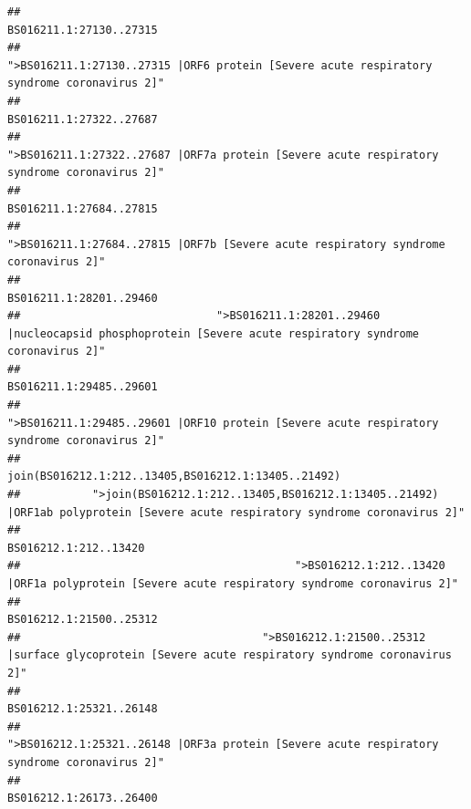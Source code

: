 \documentclass[
]{article}
\begin{document}
\begin{verbatim}
##                                                                                                                BS016211.1:27130..27315 
##                                             ">BS016211.1:27130..27315 |ORF6 protein [Severe acute respiratory syndrome coronavirus 2]" 
##                                                                                                                BS016211.1:27322..27687 
##                                            ">BS016211.1:27322..27687 |ORF7a protein [Severe acute respiratory syndrome coronavirus 2]" 
##                                                                                                                BS016211.1:27684..27815 
##                                                    ">BS016211.1:27684..27815 |ORF7b [Severe acute respiratory syndrome coronavirus 2]" 
##                                                                                                                BS016211.1:28201..29460 
##                              ">BS016211.1:28201..29460 |nucleocapsid phosphoprotein [Severe acute respiratory syndrome coronavirus 2]" 
##                                                                                                                BS016211.1:29485..29601 
##                                            ">BS016211.1:29485..29601 |ORF10 protein [Severe acute respiratory syndrome coronavirus 2]" 
##                                                                                    join(BS016212.1:212..13405,BS016212.1:13405..21492) 
##           ">join(BS016212.1:212..13405,BS016212.1:13405..21492) |ORF1ab polyprotein [Severe acute respiratory syndrome coronavirus 2]" 
##                                                                                                                  BS016212.1:212..13420 
##                                          ">BS016212.1:212..13420 |ORF1a polyprotein [Severe acute respiratory syndrome coronavirus 2]" 
##                                                                                                                BS016212.1:21500..25312 
##                                     ">BS016212.1:21500..25312 |surface glycoprotein [Severe acute respiratory syndrome coronavirus 2]" 
##                                                                                                                BS016212.1:25321..26148 
##                                            ">BS016212.1:25321..26148 |ORF3a protein [Severe acute respiratory syndrome coronavirus 2]" 
##                                                                                                                BS016212.1:26173..26400 

\end{verbatim}
\end{document}
